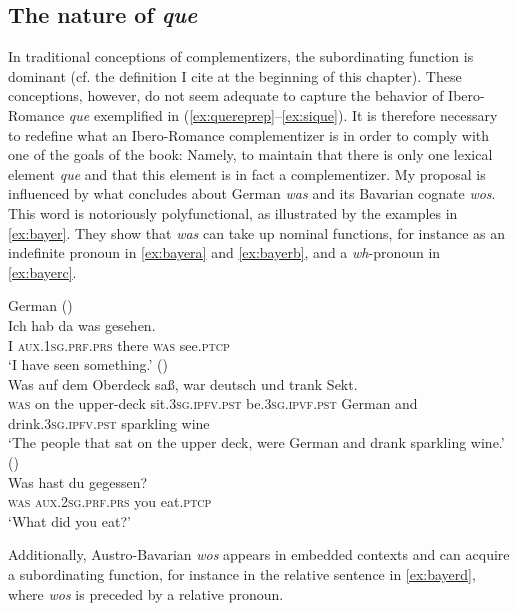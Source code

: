 \subsection{The nature of \emph{que}}
\begin{sloppypar}
In traditional conceptions of complementizers, the subordinating function is dominant (cf. the definition I cite at the beginning of this chapter). These conceptions, however, do not seem adequate to capture  the behavior of Ibero-Romance \emph{que} exemplified in (\ref{ex:quereprep}--\ref{ex:sique}). It is therefore necessary to redefine what an Ibero-Romance complementizer is in order to comply with one of the goals of the book: Namely, to maintain that there is only one lexical element \emph{que} and that this element is in fact a complementizer. My proposal is influenced by  what  \citet{Bayer2002,Bayer2004} concludes about German \emph{was} and its Bavarian cognate \emph{wos}. This word is notoriously polyfunctional, as illustrated by the examples in \eqref{ex:bayer}. They show that \emph{was} can take up nominal functions, for instance as an indefinite pronoun in \eqref{ex:bayera} and \eqref{ex:bayerb}, and  a \textit{wh}-pronoun in \eqref{ex:bayerc}. 
\end{sloppypar}

\ea\label{ex:bayer}German 
\ea\label{ex:bayera}  (\citealt[288: ex 23a]{Bayer2002})\\
\gll Ich hab da was gesehen. \\
I \textsc{aux.1sg.prf.prs} there \textsc{was} see.\textsc{ptcp}\\
\glt`I have seen something.' 
\ex\label{ex:bayerb} 
(\citealt[288: ex 20b]{Bayer2002})\\
\gll Was auf dem Oberdeck saß, war deutsch und trank {Sekt. }\\
\textsc{was} on the upper-deck sit.\textsc{3sg.ipfv.pst} be.\textsc{3sg.ipvf.pst} German and drink.\textsc{3sg.ipfv.pst} {sparkling wine}  \\
\glt`The people that sat on the upper deck, were German and drank sparkling wine.'  
\ex\label{ex:bayerc}
(\citealt[288: ex 19b]{Bayer2002}) \\
\gll  Was hast du gegessen? \\
\textsc{was} \textsc{aux.2sg.prf.prs} you eat.\textsc{ptcp}\\
\glt`What did you eat?' 
\z
\z

Additionally,   Austro-Bavarian \emph{wos} appears in embedded contexts and can acquire a subordinating function, for instance in the relative sentence in \eqref{ex:bayerd}, where \emph{wos} is preceded by a relative pronoun. 
 
